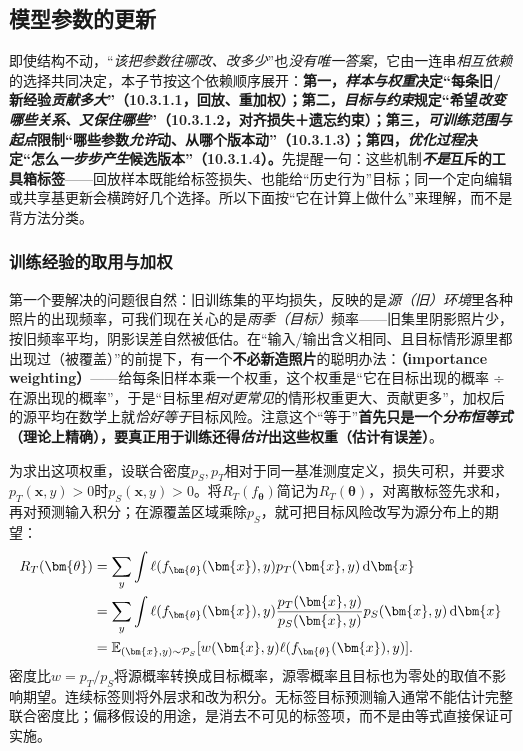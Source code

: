 \subsection{模型参数的更新}
\label{sec:ket-update-parameters}

即使结构不动，“\emph{该把参数往哪改、改多少}”也\emph{没有唯一答案}，它由一连串\emph{相互依赖}的选择共同决定，本子节按这个依赖顺序展开：\textbf{第一，\emph{样本与权重}决定“每条旧/新经验\emph{贡献多大}”（10.3.1.1，回放、重加权）；第二，\emph{目标与约束}规定“希望\emph{改变哪些关系、又\emph{保住}哪些}”（10.3.1.2，对齐损失＋遗忘约束）；第三，\emph{可训练范围与起点}限制“哪些参数\emph{允许}动、从哪个版本动”（10.3.1.3）；第四，\emph{优化过程}决定“怎么\emph{一步步产生}候选版本”（10.3.1.4）。}先提醒一句：这些机制\textbf{\emph{不是}互斥的工具箱标签}——回放样本既能给标签损失、也能给“历史行为”目标；同一个定向编辑或共享基更新会横跨好几个选择。所以下面按“它在计算上做什么”来理解，而不是背方法分类。

\subsubsection{训练经验的取用与加权}
\label{sec:ket-update-weighting}

第一个要解决的问题很自然：旧训练集的平均损失，反映的是\emph{源（旧）环境}里各种照片的出现频率，可我们现在关心的是\emph{雨季（目标）}频率——旧集里阴影照片少，按旧频率平均，阴影误差自然被低估。在“输入/输出含义相同、且目标情形源里都出现过（被覆盖）”的前提下，有一个\textbf{不必新造照片}的聪明办法：\textbf{（importance weighting）}——给每条旧样本乘一个权重，这个权重是“它在目标出现的概率 ÷ 在源出现的概率”，于是“目标里\emph{相对更常见}的情形权重更大、贡献更多”，加权后的源平均在数学上就\emph{恰好等于}目标风险。注意这个“等于”\textbf{首先只是一个\emph{分布恒等式}（理论上精确），要真正用于训练还得\emph{估计}出这些权重（估计有误差）}。

为求出这项权重，设联合密度$p_S,p_T$相对于同一基准测度定义，损失可积，并要求$p_T(\bm{x},y)>0$时$p_S(\bm{x},y)>0$。将$R_T(f_{\bm\theta})$简记为$R_T(\bm\theta)$，对离散标签先求和，再对预测输入积分；在源覆盖区域乘除$p_S$，就可把目标风险改写为源分布上的期望：
\begin{align}
R_T(\bm{\theta})
&=\sum_y\int \ell(f_{\bm{\theta}}(\bm{x}),y)
       p_T(\bm{x},y)\,\mathrm{d}\bm{x}\notag\\
&=\sum_y\int \ell(f_{\bm{\theta}}(\bm{x}),y)
       \frac{p_T(\bm{x},y)}{p_S(\bm{x},y)}
       p_S(\bm{x},y)\,\mathrm{d}\bm{x}\notag\\
&=\mathbb E_{(\bm{x},y)\sim\mathcal P_S}
  [w(\bm{x},y)\ell(f_{\bm{\theta}}(\bm{x}),y)].
\label{eq:ket-update-importance}
\end{align}
密度比$w=p_T/p_S$将源概率转换成目标概率，源零概率且目标也为零处的取值不影响期望。连续标签则将外层求和改为积分。无标签目标预测输入通常不能估计完整联合密度比；偏移假设的用途，是消去不可见的标签项，而不是由等式直接保证可实施。


